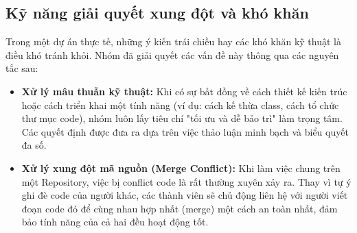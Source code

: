 \subsection{Kỹ năng giải quyết xung đột và khó khăn}
Trong một dự án thực tế, những ý kiến trái chiều hay các khó khăn kỹ thuật là điều khó tránh khỏi. Nhóm đã giải quyết các vấn đề này thông qua các nguyên tắc sau:
\begin{itemize}
    \item \textbf{Xử lý mâu thuẫn kỹ thuật:} Khi có sự bất đồng về cách thiết kế kiến trúc hoặc cách triển khai một tính năng (ví dụ: cách kế thừa class, cách tổ chức thư mục code), nhóm luôn lấy tiêu chí "tối ưu và dễ bảo trì" làm trọng tâm. Các quyết định được đưa ra dựa trên việc thảo luận minh bạch và biểu quyết đa số.
    \item \textbf{Xử lý xung đột mã nguồn (Merge Conflict):} Khi làm việc chung trên một Repository, việc bị conflict code là rất thường xuyên xảy ra. Thay vì tự ý ghi đè code của người khác, các thành viên sẽ chủ động liên hệ với người viết đoạn code đó để cùng nhau hợp nhất (merge) một cách an toàn nhất, đảm bảo tính năng của cả hai đều hoạt động tốt.
\end{itemize}
